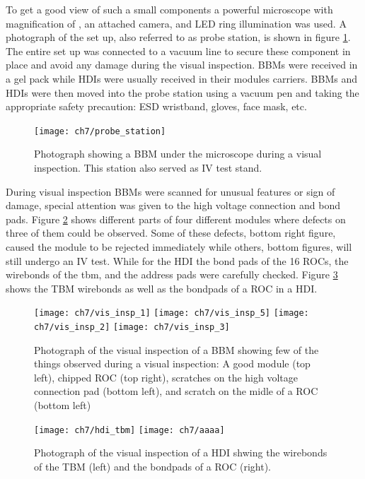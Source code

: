 To get a good view of such a small components a powerful microscope with magnification of {}, an attached camera, and LED ring illumination was used. A photograph of the set up, also referred to as probe station, is shown in figure \ref{fig:probe_station}. The entire set up was connected to a vacuum line to secure these component in place and avoid any damage during the visual inspection. BBMs were received in a gel pack while HDIs were usually received in their modules carriers. BBMs and HDIs were then moved into the probe station using a vacuum pen and taking the appropriate safety precaution: ESD wristband, gloves, face mask, etc.

\begin{figure}[!h]
	\centering
	\texttt{[image: ch7/probe\_station]}
	\caption[Photograph of the visual inspection and IV test station.]{Photograph showing a BBM under the microscope during a visual inspection. This station also served as IV test stand.}
	\label{fig:probe_station}
\end{figure}

During visual inspection BBMs were scanned for unusual features or sign of damage, special attention was given to the high voltage connection and bond pads. Figure \ref{fig:vis_insp_bbm} shows different parts of four different modules where defects on three of them could be observed. Some of these defects, bottom right figure, caused the module to be rejected immediately while others, bottom figures, will still undergo an IV test. While for the HDI the bond pads of the 16 ROCs, the wirebonds of the tbm, and the address pads were carefully checked. Figure \ref{fig:vis_insp_hdi} shows the TBM wirebonds as well as the bondpads of a ROC in a HDI.

\begin{figure}[!h]
	\centering
	\texttt{[image: ch7/vis\_insp\_1]}
	\texttt{[image: ch7/vis\_insp\_5]}
	\texttt{[image: ch7/vis\_insp\_2]}
	\texttt{[image: ch7/vis\_insp\_3]}
	\caption[Visual inspection of a bare module.]{Photograph of the visual inspection of a BBM showing few of the things observed during a visual inspection: A good module (top left), chipped ROC (top right), scratches on the high voltage connection pad (bottom left), and scratch on the midle of a ROC (bottom left)}
	\label{fig:vis_insp_bbm}
\end{figure}

\begin{figure}[!h]
	\centering
	\texttt{[image: ch7/hdi\_tbm]}
	\texttt{[image: ch7/aaaa]}
	\caption[Visual inspection of a HDI.]{Photograph of the visual inspection of a HDI shwing the wirebonds of the TBM (left) and the bondpads of a ROC (right). {}}
	\label{fig:vis_insp_hdi}
\end{figure}

